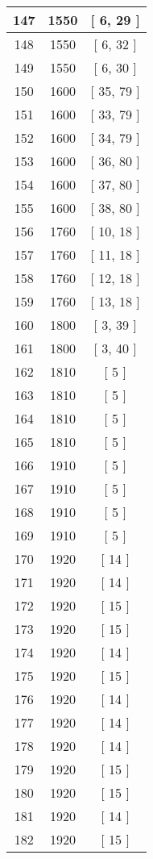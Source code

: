 \begin{center}
\begin{longtable}[H]{|| c c c ||}
\hline
147 & 1550 & [ 6, 29 ] \\ 
\hline
148 & 1550 & [ 6, 32 ] \\ 
\hline
149 & 1550 & [ 6, 30 ] \\ 
\hline
150 & 1600 & [ 35, 79 ] \\ 
\hline
151 & 1600 & [ 33, 79 ] \\ 
\hline
152 & 1600 & [ 34, 79 ] \\ 
\hline
153 & 1600 & [ 36, 80 ] \\ 
\hline
154 & 1600 & [ 37, 80 ] \\ 
\hline
155 & 1600 & [ 38, 80 ] \\ 
\hline
156 & 1760 & [ 10, 18 ] \\ 
\hline
157 & 1760 & [ 11, 18 ] \\ 
\hline
158 & 1760 & [ 12, 18 ] \\ 
\hline
159 & 1760 & [ 13, 18 ] \\ 
\hline
160 & 1800 & [ 3, 39 ] \\ 
\hline
161 & 1800 & [ 3, 40 ] \\ 
\hline
162 & 1810 & [ 5 ] \\ 
\hline
163 & 1810 & [ 5 ] \\ 
\hline
164 & 1810 & [ 5 ] \\ 
\hline
165 & 1810 & [ 5 ] \\ 
\hline
166 & 1910 & [ 5 ] \\ 
\hline
167 & 1910 & [ 5 ] \\ 
\hline
168 & 1910 & [ 5 ] \\ 
\hline
169 & 1910 & [ 5 ] \\ 
\hline
170 & 1920 & [ 14 ] \\ 
\hline
171 & 1920 & [ 14 ] \\ 
\hline
172 & 1920 & [ 15 ] \\ 
\hline
173 & 1920 & [ 15 ] \\ 
\hline
174 & 1920 & [ 14 ] \\ 
\hline
175 & 1920 & [ 15 ] \\ 
\hline
176 & 1920 & [ 14 ] \\ 
\hline
177 & 1920 & [ 14 ] \\ 
\hline
178 & 1920 & [ 14 ] \\ 
\hline
179 & 1920 & [ 15 ] \\ 
\hline
180 & 1920 & [ 15 ] \\ 
\hline
181 & 1920 & [ 14 ] \\ 
\hline
182 & 1920 & [ 15 ] \\ 

\end{longtable}
\end{center}
